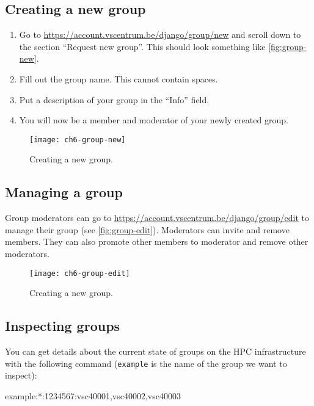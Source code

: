 \subsection{Creating a new group}

\begin{enumerate}
    \item Go to \url{https://account.vscentrum.be/django/group/new} and scroll down
        to the section ``Request new group''. This should look something like
        \autoref{fig:group-new}.
    \item Fill out the group name. This cannot contain spaces.
    \item Put a description of your group in the ``Info'' field.
    \item You will now be a member and moderator of your newly created group.
\end{enumerate}

\begin{figure}[!htbp]
  \caption{Creating a new group.}
  \centering
    \texttt{[image: ch6-group-new]}
\end{figure}\label{fig:group-new}

\subsection{Managing a group}

Group moderators can go to \url{https://account.vscentrum.be/django/group/edit} to
manage their group (see \autoref{fig:group-edit}). Moderators can invite and remove members. They can also promote
other members to moderator and remove other moderators.

\begin{figure}[!htbp]
  \caption{Creating a new group.}
  \centering
    \texttt{[image: ch6-group-edit]}
\end{figure}\label{fig:group-edit}

\subsection{Inspecting groups}

You can get details about the current state of groups on the HPC infrastructure
with the following command (\lstinline|example| is the name of the group we want to inspect):

\begin{prompt}
example:*:1234567:vsc40001,vsc40002,vsc40003
\end{prompt}

